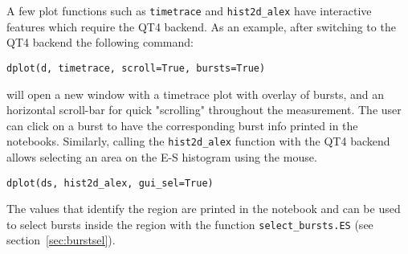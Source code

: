 A few plot functions such as \verb|timetrace| and \verb|hist2d_alex| have interactive features 
which require the QT4 backend. As an example, after switching to the QT4 backend
the following command:

\begin{lstlisting}
dplot(d, timetrace, scroll=True, bursts=True)
\end{lstlisting}

\noindent
will open a new window with a timetrace plot with overlay of bursts, and an horizontal scroll-bar for quick
"scrolling" throughout the measurement. The user can click on a burst to have the corresponding burst info 
printed in the notebooks.
Similarly, calling the \verb|hist2d_alex| function with the QT4 backend allows
selecting an area on the E-S histogram using the mouse.

\begin{lstlisting}
dplot(ds, hist2d_alex, gui_sel=True)
\end{lstlisting}

The values that identify the region are printed in the notebook and can be used 
to select bursts inside the region with the function \verb|select_bursts.ES| (see
section~\ref{sec:burstsel}).
